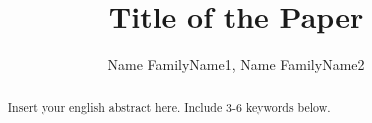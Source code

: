 \documentclass[12pt]{llncs}
\begin{document}
\begin{englishtitle}
\title{Title of the Paper}
\author{Name FamilyName1,
Name FamilyName2}

\maketitle

\begin{abstract}
Insert your english abstract here. Include 3-6 keywords below.

\end{abstract}
\end{englishtitle}
\end{document}
